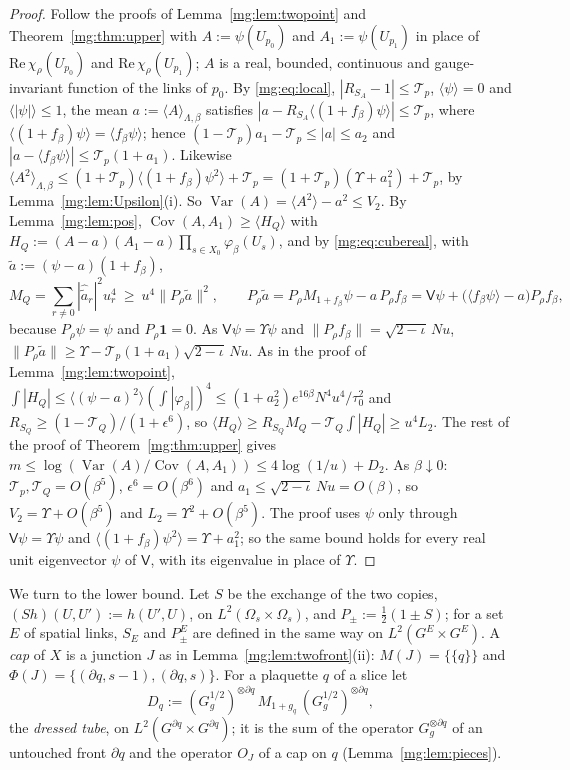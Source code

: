 \documentclass[11pt,a4paper]{article}
\theoremstyle{definition}
\theoremstyle{remark}
\DeclareMathOperator{\Cov}{Cov}
\DeclareMathOperator{\Var}{Var}
\newcommand{\norm}[1]{\lVert #1\rVert}
\begin{document}
\begin{proof}
Follow the proofs of Lemma~\ref{mg:lem:twopoint} and Theorem~\ref{mg:thm:upper} with $A:=\psi(U_{p_0})$ and $A_1:=\psi(U_{p_1})$ in place of
$\mathrm{Re}\,\chi_\rho(U_{p_0})$ and $\mathrm{Re}\,\chi_\rho(U_{p_1})$; $A$ is a real, bounded, continuous and gauge-invariant function of the links of $p_0$.
By \eqref{mg:eq:local}, $|R_{S_A}-1|\le\mathcal T_p$, $\langle\psi\rangle=0$ and $\langle|\psi|\rangle\le1$, the mean $a:=\langle A\rangle_{\Lambda,\beta}$ satisfies
$|a-R_{S_A}\langle(1+f_\beta)\psi\rangle|\le\mathcal T_p$, where $\langle(1+f_\beta)\psi\rangle=\langle f_\beta\psi\rangle$; hence $(1-\mathcal T_p)a_1-\mathcal T_p\le|a|\le a_2$ and
$|a-\langle f_\beta\psi\rangle|\le\mathcal T_p(1+a_1)$. Likewise $\langle A^2\rangle_{\Lambda,\beta}\le(1+\mathcal T_p)\langle(1+f_\beta)\psi^2\rangle+\mathcal T_p=(1+\mathcal T_p)(\Upsilon+a_1^2)+\mathcal T_p$,
by Lemma~\ref{mg:lem:Upsilon}(i). So $\Var(A)=\langle A^2\rangle-a^2\le V_2$. By Lemma~\ref{mg:lem:pos}, $\Cov(A,A_1)\ge\langle H_Q\rangle$ with
$H_Q:=(A-a)(A_1-a)\prod_{s\in X_0}\varphi_\beta(U_s)$, and by \eqref{mg:eq:cubereal}, with $\tilde a:=(\psi-a)(1+f_\beta)$,
\[
M_Q=\sum_{r\ne0}|\hat{\tilde a}_r|^2u_r^4\ \ge\ u^4\norm{P_\rho\tilde a}^2,\qquad P_\rho\tilde a=P_\rho M_{1+f_\beta}\psi-a\,P_\rho f_\beta=\mathsf V\psi+\bigl(\langle f_\beta\psi\rangle-a\bigr)P_\rho f_\beta ,
\]
because $P_\rho\psi=\psi$ and $P_\rho\mathbf1=0$. As $\mathsf V\psi=\Upsilon\psi$ and $\norm{P_\rho f_\beta}=\sqrt{2-\iota}\,Nu$,
$\norm{P_\rho\tilde a}\ge\Upsilon-\mathcal T_p(1+a_1)\sqrt{2-\iota}\,Nu$. As in the proof of Lemma~\ref{mg:lem:twopoint},
$\int|H_Q|\le\langle(\psi-a)^2\rangle(\int|\varphi_\beta|)^4\le(1+a_2^2)e^{16\beta}N^4u^4/\tau_0^2$ and $R_{S_Q}\ge(1-\mathcal T_Q)/(1+\epsilon^6)$, so
$\langle H_Q\rangle\ge R_{S_Q}M_Q-\mathcal T_Q\int|H_Q|\ge u^4L_2$. The rest of the proof of Theorem~\ref{mg:thm:upper} gives
$m\le\log(\Var(A)/\Cov(A,A_1))\le4\log(1/u)+D_2$. As $\beta\downarrow0$: $\mathcal T_p,\mathcal T_Q=O(\beta^5)$, $\epsilon^6=O(\beta^6)$ and
$a_1\le\sqrt{2-\iota}\,Nu=O(\beta)$, so $V_2=\Upsilon+O(\beta^5)$ and $L_2=\Upsilon^2+O(\beta^5)$. The proof uses $\psi$ only through $\mathsf V\psi=\Upsilon\psi$ and
$\langle(1+f_\beta)\psi^2\rangle=\Upsilon+a_1^2$; so the same bound holds for every real unit eigenvector $\psi$ of $\mathsf V$, with its eigenvalue in place of $\Upsilon$.
\end{proof}

We turn to the lower bound. Let $S$ be the exchange of the two copies, $(Sh)(U,U'):=h(U',U)$, on $L^2(\Omega_s\times\Omega_s)$, and
$P_\pm:=\frac12(1\pm S)$; for a set $E$ of spatial links, $S_E$ and $P^E_\pm$ are defined in the same way on $L^2(G^E\times G^E)$. A \emph{cap} of $X$ is
a junction $J$ as in Lemma~\ref{mg:lem:twofront}(ii): $M(J)=\{\{q\}\}$ and $\Phi(J)=\{(\partial q,s-1),(\partial q,s)\}$. For a plaquette $q$ of a slice let
\[
D_q:=(G_g^{1/2})^{\otimes\partial q}\,M_{1+g_q}\,(G_g^{1/2})^{\otimes\partial q},
\]
the \emph{dressed tube}, on $L^2(G^{\partial q}\times G^{\partial q})$; it is the sum of the operator $G_g^{\otimes\partial q}$ of an untouched front $\partial q$ and the
operator $O_J$ of a cap on $q$ (Lemma~\ref{mg:lem:pieces}).
\end{document}
